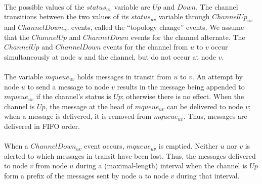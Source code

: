 \paragraph{}The possible values of the $status_{uv}$ variable are $Up$ and $Down$. The channel transitions between the two values of its $status_{uv}$ variable through $ChannelUp_{uv}$ and $ChannelDown_{uv}$ events, called the “topology change” events. We assume that the $ChannelUp$ and $ChannelDown$ events for the channel alternate. The $ChannelUp$ and $ChannelDown$ events for the channel from $u$ to $v$ occur simultaneously at node $u$ and the channel, but do not occur at node $v$.
\paragraph{}The variable $mqueue_{uv}$ holds messages in transit from $u$ to $v$. An attempt by node $u$ to send a message to node $v$ results in the message being appended to $mqueue_{uv}$ if the channel’s status is $Up$; otherwise there is no effect. When the channel is $Up$, the message at the head of $mqueue_{uv}$ can be delivered to node $v$; when a message is delivered, it is removed from $mqueue_{uv}$. Thus, messages are delivered in FIFO order.
\paragraph{}When a $ChannelDown_{uv}$ event occurs, $mqueue_{uv}$ is emptied. Neither $u$ nor $v$ is alerted to which messages in transit have been lost. Thus, the messages delivered to node $v$ from node $u$ during a (maximal-length) interval when the channel is $Up$ form a prefix of the messages sent by node $u$ to node $v$ during that interval.
